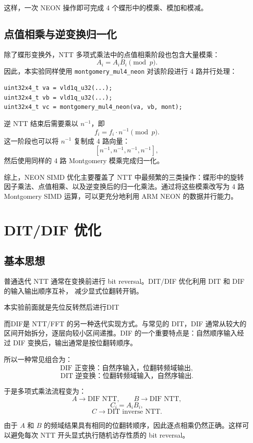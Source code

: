 \documentclass[a4paper]{article}
\begin{document}
这样，一次 NEON 操作即可完成 4 个蝶形中的模乘、模加和模减。

\subsection{点值相乘与逆变换归一化}

除了蝶形变换外，NTT 多项式乘法中的点值相乘阶段也包含大量模乘：
\[
A_i=A_iB_i\pmod p.
\]
因此，本实验同样使用 \texttt{montgomery\_mul4\_neon} 对该阶段进行 4 路并行处理：
\begin{lstlisting}
uint32x4_t va = vld1q_u32(...);
uint32x4_t vb = vld1q_u32(...);
uint32x4_t vc = montgomery_mul4_neon(va, vb, mont);
\end{lstlisting}

逆 NTT 结束后需要乘以 \(n^{-1}\)，即
\[
f_i=f_i\cdot n^{-1}\pmod p.
\]
这一阶段也可以将 \(n^{-1}\) 复制成 4 路向量：
\[
[n^{-1},n^{-1},n^{-1},n^{-1}],
\]
然后使用同样的 4 路 Montgomery 模乘完成归一化。

综上，NEON SIMD 优化主要覆盖了 NTT 中最频繁的三类操作：蝶形中的旋转因子乘法、点值相乘、以及逆变换后的归一化乘法。通过将这些模乘改写为 4 路 Montgomery SIMD 运算，可以更充分地利用 ARM NEON 的数据并行能力。

\section{DIT/DIF 优化}

\subsection{基本思想}

普通迭代 NTT 通常在变换前进行 bit reversal。DIT/DIF 优化利用 DIT 和 DIF 的输入输出顺序互补，
减少显式位翻转开销。

本实验前面就是先位反转然后进行DIT

而DIF是 NTT/FFT 的另一种迭代实现方式。与常见的 DIT，DIF 通常从较大的区间开始拆分，逐层向较小区间递推。DIF 的一个重要特点是：自然顺序输入经过 DIF 变换后，输出通常是按位翻转顺序。

所以一种常见组合为：
\[
\text{DIF 正变换：自然序输入，位翻转频域输出},
\]
\[
\text{DIT 逆变换：位翻转频域输入，自然序输出}.
\]

于是多项式乘法流程变为：
\[
A\rightarrow\text{DIF NTT},\qquad
B\rightarrow\text{DIF NTT},
\]
\[
C_i=A_iB_i,
\]
\[
C\rightarrow\text{DIT inverse NTT}.
\]

由于 $A$ 和 $B$ 的频域结果具有相同的位翻转顺序，因此逐点相乘仍然正确。这样可以避免每次
NTT 开头显式执行随机访存性质的 bit reversal。
\end{document}
